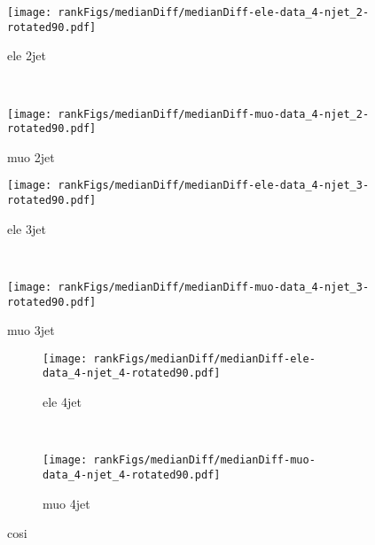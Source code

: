 \begin{figure*}[t]
    \centering
    \begin{subfigure}[t]{0.45\textwidth}
        \centering
        \texttt{[image: rankFigs/medianDiff/medianDiff-ele-data\_4-njet\_2-rotated90.pdf]}
\caption{ele 2jet}
    \end{subfigure}%
    ~ 
    \begin{subfigure}[t]{0.45\textwidth}
        \centering
        \texttt{[image: rankFigs/medianDiff/medianDiff-muo-data\_4-njet\_2-rotated90.pdf]}
\caption{muo 2jet}
    \end{subfigure}
\end{figure*}

\begin{figure*}[h]
\ContinuedFloat
    \centering
    \begin{subfigure}[t]{0.45\textwidth}
        \centering
        \texttt{[image: rankFigs/medianDiff/medianDiff-ele-data\_4-njet\_3-rotated90.pdf]}
\caption{ele 3jet}
    \end{subfigure}%
    ~ 
    \begin{subfigure}[t]{0.45\textwidth}
        \centering
        \texttt{[image: rankFigs/medianDiff/medianDiff-muo-data\_4-njet\_3-rotated90.pdf]}
\caption{muo 3jet}
    \end{subfigure}
\end{figure*}

\begin{figure}[b]
\ContinuedFloat
    \centering
    \begin{subfigure}[t]{0.45\textwidth}
        \centering
        \texttt{[image: rankFigs/medianDiff/medianDiff-ele-data\_4-njet\_4-rotated90.pdf]}
\caption{ele 4jet}
    \end{subfigure}%
    ~ 
    \begin{subfigure}[t]{0.45\textwidth}
        \centering
        \texttt{[image: rankFigs/medianDiff/medianDiff-muo-data\_4-njet\_4-rotated90.pdf]}
\caption{muo 4jet}
    \end{subfigure}
    \caption{cosi}
\end{figure}